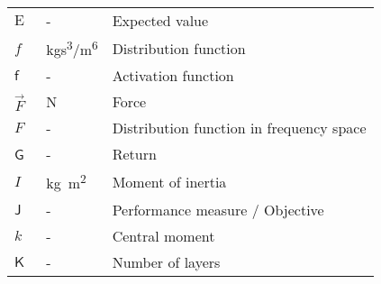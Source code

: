 \begin{longtable}{p{5cm}p{4cm}p{5cm}}
    $\mathrm{E}$			& \SI{}{-}		& Expected value \\
    $f$						& \SI{}{kgs^3/m^6} & Distribution function \\
    $\mathsf{f}$			& \SI{}{-}		& Activation function \\
    $\vec{F}$				& \SI{}{N}		& Force \\
    $F$						& \SI{}{-}		& Distribution function in frequency space \\
    $\mathsf{G}$			& \SI{}{-}		& Return \\
    $I$						& \SI{}{kg m^2} & Moment of inertia \\
    $\mathsf{J}$			& \SI{}{-}		& Performance measure / Objective \\
    $k$						& \SI{}{-}		& Central moment \\
    $\mathsf{K}$			& \SI{}{-}		& Number of layers \\

\end{longtable}
